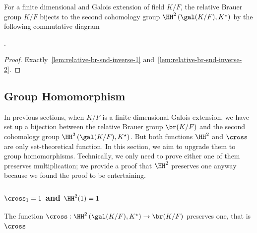 \begin{corollary}\label{cor:relative-br-2nd-coh-bij}
  For a finite dimensional and Galois extension of field $K/F$, the relative Brauer group $K/F$ bijects to the second cohomology group $\HH^{2}\left(\gal(K/F), K^{\star}\right)$ by the following commutative diagram
  \begin{center}
  .
\end{center}
\leanok
{}
\end{corollary}

\begin{proof}
  Exactly~\cref{lem:relative-br-snd-inverse-1} and~\cref{lem:relative-br-snd-inverse-2}.
\end{proof}

\subsection{Group Homomorphism}

In previous sections, when $K/F$ is a finite dimensional Galois extension, we have set up a bijection between the relative Brauer group $\br(K/F)$ and the second cohomology group $\HH^{2}\left(\gal(K/F), K^{\star}\right)$. But both functions $\HH^{2}$ and $\cross$ are only set-theoretical function. In this section, we aim to upgrade them to group homomorphisms. Technically, we only need to prove either one of them preserves multiplication; we provide a proof that $\HH^{2}$ preserves one anyway because we found the proof to be entertaining.

\subsubsection{$\cross_{1} = 1$ and $\HH^{2}(1) = 1$}

\begin{theorem}
  \label{thm:map_one}
  The function $\cross:\HH^{2}\left(\gal(K/F), K^{\star}\right) \to \br(K/F)$ preserves one, that is $\cross_{}$
 \leanok
\end{theorem}

